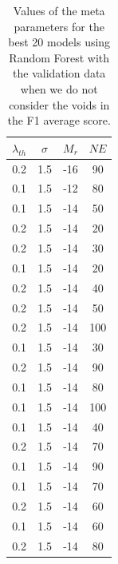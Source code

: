 \documentclass[usenatbib]{mnras}
\begin{document}
\begin{table}
\centering
\begin{tabular}{cccc}
\hline
   $\lambda_{th}$ &   $\sigma$ &   $M_r$ &   $NE$ \\
\hline
         0.2 &        1.5 &     -16 &     90 \\
         0.1 &        1.5 &     -12 &     80 \\
         0.1 &        1.5 &     -14 &     50 \\
         0.2 &        1.5 &     -14 &     20 \\
         0.2 &        1.5 &     -14 &     30 \\
         0.1 &        1.5 &     -14 &     20 \\
         0.2 &        1.5 &     -14 &     40 \\
         0.2 &        1.5 &     -14 &     50 \\
         0.2 &        1.5 &     -14 &    100 \\
         0.1 &        1.5 &     -14 &     30 \\
         0.2 &        1.5 &     -14 &     90 \\
         0.1 &        1.5 &     -14 &     80 \\
         0.1 &        1.5 &     -14 &    100 \\
         0.1 &        1.5 &     -14 &     40 \\
         0.2 &        1.5 &     -14 &     70 \\
         0.1 &        1.5 &     -14 &     90 \\
         0.1 &        1.5 &     -14 &     70 \\
         0.2 &        1.5 &     -14 &     60 \\
         0.1 &        1.5 &     -14 &     60 \\
         0.2 &        1.5 &     -14 &     80 \\
\hline
\end{tabular}
\caption{Values of the meta parameters for the best 20 models using Random Forest with the validation data when we do not consider the voids in the F1 average score.}
\label{tab:parameters}
\end{table}
\end{document}
